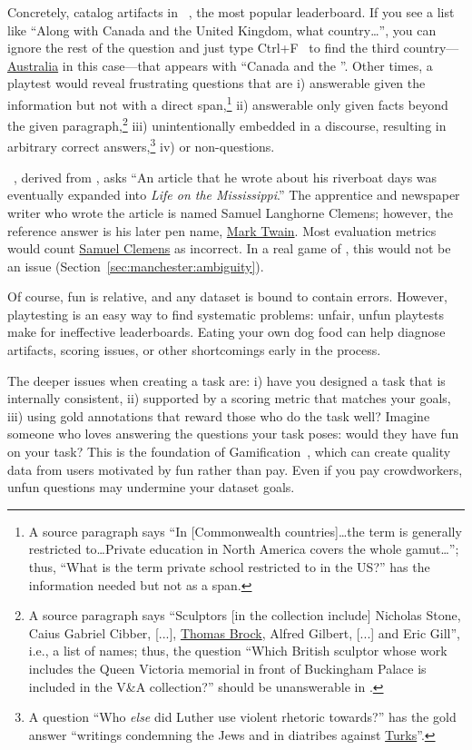 Concretely, \citet{weissenborn-17} catalog artifacts in \squad{}~\citep{rajpurkar-18}, the most popular  leaderboard.
If you see a list like ``Along with Canada and the United Kingdom, what country\dots'', you can ignore the rest of the question and just type Ctrl+F~\citep{yuan-19,russell-20} to find the third country---\underline{Australia} in this case---that appears with ``Canada and the ''.
Other times, a \squad{} playtest would reveal frustrating questions that are 
i) answerable given the information but not with a direct span,\footnote{A source paragraph says ``In [Commonwealth countries]\dots the term is generally restricted to\dots Private education in North America covers the whole gamut\dots''; thus, ``What is the term private school restricted to in the US?'' has the information needed but not as a span.}
ii) answerable only given facts beyond the given paragraph,\footnote{A source paragraph says ``Sculptors [in the collection include] Nicholas Stone, Caius Gabriel Cibber, [...], \underline{Thomas Brock}, Alfred Gilbert, [...] and Eric Gill'', i.e., a list of names; thus, the question ``Which British sculptor whose work includes the Queen Victoria memorial in front of Buckingham Palace is included in the V\&A collection?'' should be unanswerable in \squad{}.}
iii) unintentionally embedded in a discourse, resulting
in arbitrary correct answers,\footnote{A question ``Who \emph{else} did Luther use violent rhetoric towards?'' has the gold answer ``writings condemning the Jews and in diatribes against \underline{Turks}''.}
iv)  or non-questions.

\searchqa{}~\citep{dunn-17}, derived from \jeopardy{}, asks ``An article that he wrote about his riverboat days was eventually expanded into \textit{Life on the Mississippi}.''
The apprentice and newspaper writer who wrote the article is named Samuel Langhorne Clemens; however, the reference answer is his later pen name, \underline{Mark Twain}.
Most \qa{} evaluation metrics would count \underline{Samuel Clemens} as incorrect.
In a real game of \jeopardy{}, this would not be an issue (Section~\ref{sec:manchester:ambiguity}).

Of course, fun is relative, and any dataset is bound to contain errors.
However, playtesting is an easy way to find systematic problems: unfair, unfun playtests make for ineffective leaderboards.
Eating your own dog food can help diagnose artifacts, scoring issues, or other shortcomings early in the process.

The deeper issues when creating a  task are:
i) have you designed a task that is internally consistent,
ii) supported by a scoring metric that matches your goals,
iii) using gold annotations that reward those who do the task well?
Imagine someone who loves answering the questions your task poses: would they have fun on your task?
This is the foundation of Gamification~\citep{ahn-06}, which can create quality data from users motivated by fun rather than pay.
Even if you pay crowdworkers, unfun questions may undermine your dataset goals.

